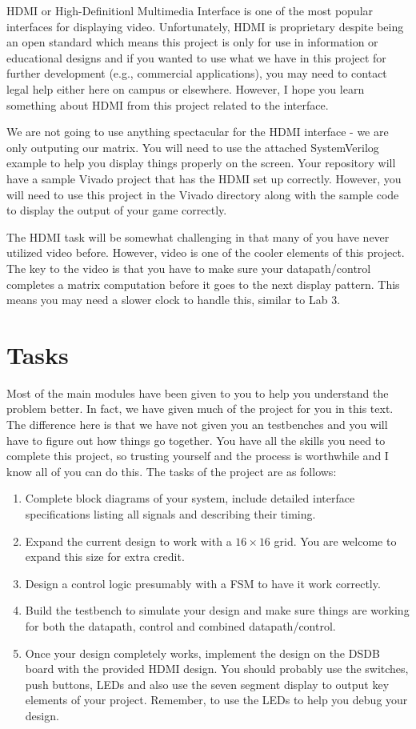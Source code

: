 \documentclass{article}
\begin{document}
HDMI or High-Definitionl Multimedia Interface is one of the most
popular interfaces for displaying video.  Unfortunately, HDMI is
proprietary despite being an open standard
which means this project is only for use in information or educational
designs and if you wanted to use what we have in this project for
further development (e.g., commercial applications), you may need to
contact legal help either here on campus or elsewhere.  However, I
hope you learn something about HDMI from this project related to the
interface.

We are not going to use anything spectacular for the HDMI interface -
we are only outputing our matrix.  You will need to use the attached
SystemVerilog example to help you display things properly on the
screen.  Your repository will have a sample Vivado project that has
the HDMI set up correctly.  However, you will need to use this project
in the Vivado directory along with the sample code to display the output of your
game correctly.  

The HDMI task will be somewhat challenging in that many of you have
never utilized video before.  However, video is one of the cooler
elements of this project.  The key to the video is that you have to
make sure your datapath/control completes a matrix computation before
it goes to the next display pattern.  This means you may need a slower
clock to handle this, similar to Lab 3.  


\section{Tasks}

Most of the main modules have been given to you to help you understand the
problem better.   In fact, we have given much of the project for you
in this text.  The difference here is that we have not given you an
testbenches and you will have to figure out how things go together.
You have all the skills you need to complete this project, so trusting
yourself and the process is worthwhile and I know all of you can do
this.  The tasks of the project are as follows:
\begin{enumerate}
  \item Complete block diagrams of your system, include detailed
    interface specifications listing all signals and describing their
    timing.
  \item Expand the current design to work with a $16 \times 16$ grid.
    You are welcome to expand this size for extra credit.
\item Design a control logic presumably with a FSM to have it work
  correctly.
\item  Build the testbench to simulate your design and make sure
  things are working for both the datapath, control and combined
  datapath/control.    
  \item Once your design completely works, implement the design on
    the DSDB board with the provided HDMI design.
    You should probably use the switches, push
    buttons, LEDs and also use the
    seven segment display to output key elements of your project.
    Remember, to use the LEDs to help you debug your design.      
\end{enumerate}
\end{document}
